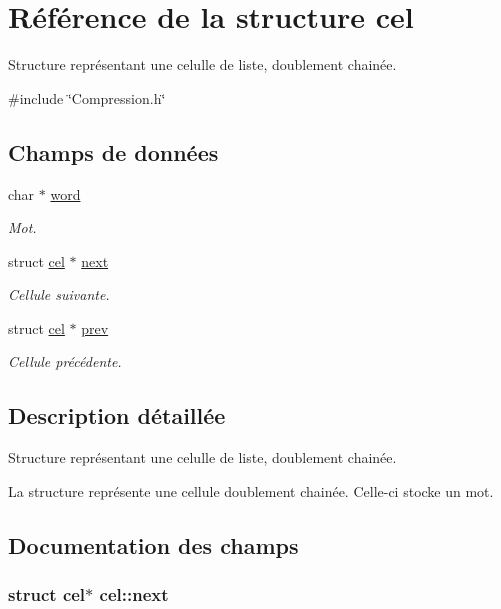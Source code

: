 \hypertarget{structcel}{\section{Référence de la structure cel}
\label{structcel}
}


Structure représentant une celulle de liste, doublement chainée.  




{\ttfamily \#include \char`\"{}Compression.\-h\char`\"{}}

\subsection*{Champs de données}
\begin{DoxyCompactItemize}
\item 
char $\ast$ \hyperlink{structcel_a6aeff9da18be20c9f448699a8ea3d17e}{word}
\begin{DoxyCompactList}\small\item\em Mot. \end{DoxyCompactList}\item 
struct \hyperlink{structcel}{cel} $\ast$ \hyperlink{structcel_a308d8b15212cb85583f334fc2bbde870}{next}
\begin{DoxyCompactList}\small\item\em Cellule suivante. \end{DoxyCompactList}\item 
struct \hyperlink{structcel}{cel} $\ast$ \hyperlink{structcel_ad3d62b4b68425aa02b5971aecb7b3909}{prev}
\begin{DoxyCompactList}\small\item\em Cellule précédente. \end{DoxyCompactList}\end{DoxyCompactItemize}


\subsection{Description détaillée}
Structure représentant une celulle de liste, doublement chainée. 

La structure représente une cellule doublement chainée. Celle-\/ci stocke un mot. 

\subsection{Documentation des champs}
\hypertarget{structcel_a308d8b15212cb85583f334fc2bbde870}{
\subsubsection[{next}]{\setlength{\rightskip}{0pt plus 5cm}struct {\bf cel}$\ast$ cel\-::next}}\label{structcel_a308d8b15212cb85583f334fc2bbde870}


